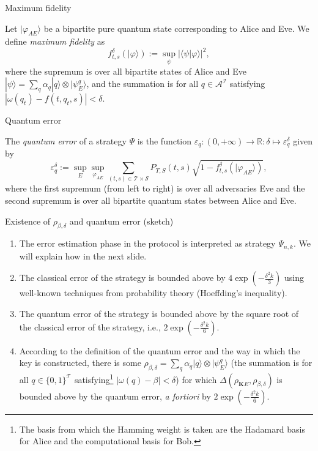 \documentclass{beamer}
\begin{document}
\begin{frame}{Maximum fidelity} 

Let $|\varphi_{AE}\rangle$ be a bipartite pure quantum state corresponding to Alice and Eve. We define \emph{maximum fidelity} as
$$
f_{t,s}^{\delta}\left( |\varphi\rangle \right) := \sup_{\psi}  | \langle \psi | \varphi \rangle |^2,
$$
where the supremum is over all bipartite states of Alice and Eve $| \psi \rangle = \sum_{q} \alpha_q |q\rangle \otimes |\psi_E^{q}\rangle$, and the summation is for all $q\in \mathcal{A}^{\mathcal{I}}$ satisfying $\left| \omega(q_{\overline{t}}) - f(t, q_t, s) \right| < \delta$.
\end{frame}

\begin{frame}{Quantum error} 

The \emph{quantum error} of a strategy $\Psi$ is the function $\varepsilon_q:(0,+\infty) \longrightarrow \mathbb{R}: \delta \mapsto \varepsilon_q^{\delta}$ given by
$$
\varepsilon_q^{\delta} :=\sup_{E} \sup_{\varphi_{AE}} \sum_{(t,s)\in\mathcal{T}\times\mathcal{S}} P_{T,S}(t,s) \sqrt{1 -  f_{t,s}^{\delta} \left(|\varphi_{AE}\rangle \right)},
$$
where the first supremum (from left to right) is over all adversaries Eve and the second supremum is over all bipartite quantum states between Alice and Eve.
\end{frame}

\begin{frame}{Existence of $\rho_{\beta,\delta}$ and quantum error (sketch)}
\begin{enumerate}[label=(\roman*)]
\item The error estimation phase in the protocol is interpreted as strategy $\Psi_{n,k}$. We will explain how in the next slide.
\item The classical error of the strategy is bounded above by $4\exp\left( -\frac{\delta^2 k}{3} \right)$ using well-known techniques from probability theory (Hoeffding's inequality).
\item The quantum error of the strategy is bounded above by the square root of the classical error of the strategy, i.e., $2\exp\left( -\frac{\delta^2 k}{6} \right)$.
\item According to the definition of the quantum error and the way in which the key is constructed, there is some
$\rho_{\beta,\delta} = \sum_{q} \alpha_q |q\rangle \otimes |\psi_E^{q}\rangle$ (the summation is for all $q\in \{0,1\}^{\mathcal{T}}$ satisfying\footnote{The basis from which the Hamming weight is taken are the Hadamard basis for Alice and the computational
basis for Bob.} $\left| \omega(q) - \beta \right| < \delta$) for which $\Delta\left( \rho_{\mathbf{K}E}, \rho_{\beta,\delta} \right)$ is bounded above by the quantum error, \emph{a fortiori} by $2\exp\left( -\frac{\delta^2 k}{6} \right)$.
\end{enumerate}
\end{frame}
\end{document}

